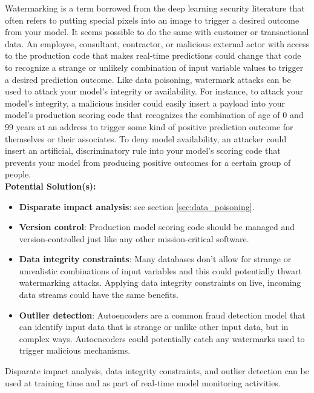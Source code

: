 \documentclass[fleqn]{article}
\begin{document}
Watermarking is a term borrowed from the deep learning security literature that often refers to putting special pixels into an image to trigger a desired outcome from your model. It seems possible to do the same with customer or transactional data. An employee, consultant, contractor, or malicious external actor with access to the production code that makes real-time predictions could change that code to recognize a strange or unlikely combination of input variable values to trigger a desired prediction outcome. Like data poisoning, watermark attacks can be used to attack your model's integrity or availability. For instance, to attack your model's integrity, a malicious insider could easily insert a payload into your model's production scoring code that recognizes the combination of age of 0 and 99 years at an address to trigger some kind of positive prediction outcome for  themselves or their associates. To deny model availability, an attacker could insert an artificial, discriminatory rule into your model's scoring code that prevents your model from producing positive outcomes for a certain group of people.\\

\noindent\textbf{Potential Solution(s):}
\begin{itemize}

\item \textbf{Disparate impact analysis}: see section \ref{sec:data_poisoning}.

\item \textbf{Version control}: Production model scoring code should be managed and version-controlled just like any other mission-critical software.

\item \textbf{Data integrity constraints}: Many databases don't  allow for strange or unrealistic combinations of input variables and this could potentially thwart watermarking attacks. Applying data integrity constraints on live, incoming data streams could have the same benefits.

\item \textbf{Outlier detection}: Autoencoders are a common fraud detection model that can identify input data that is strange or unlike other input data, but in complex ways. Autoencoders could potentially catch any watermarks used to trigger malicious mechanisms. 

\end{itemize}

\noindent Disparate impact analysis, data integrity constraints, and outlier detection can be used at training time and as part of real-time model monitoring activities.
\end{document}
